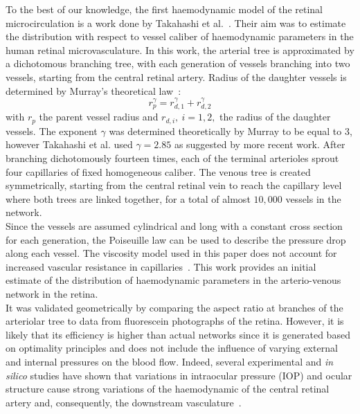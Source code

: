 \documentclass[12pt,a4paper]{article}
\begin{document}
To the best of our knowledge, the first haemodynamic model of the retinal microcirculation is a work done by Takahashi et al.~\cite{Takahashi_2009}.
Their aim was to estimate the distribution with respect to vessel caliber of haemodynamic parameters in the human retinal microvasculature.
In this work, the arterial tree is approximated by a dichotomous branching tree, with each generation of vessels branching into two vessels, starting from the central retinal artery.
Radius of the daughter vessels is determined by Murray's theoretical law~\cite{Murray_1926}:
\begin{equation}
  \label{eq:MurrayLaw}
  r_p^\gamma = r_{d,1}^\gamma + r_{d,2}^\gamma
\end{equation}
with $r_p$ the parent vessel radius and $r_{d,i},~i=1,2,$ the radius of the daughter vessels.
The exponent $\gamma$ was determined theoretically by Murray to be equal to $3$, however Takahashi et al. used $\gamma=2.85$ as suggested by more recent work.
After branching dichotomously fourteen times, each of the terminal arterioles sprout four capillaries of fixed homogeneous caliber. 
The venous tree is created symmetrically, starting from the central retinal vein to reach the capillary level where both trees are linked together, for a total of almost $10,000$ vessels in the network.\\
Since the vessels are assumed cylindrical and long with a constant cross section for each generation, the Poiseuille law can be used to describe the pressure drop along each vessel.
The viscosity model used in this paper does not account for increased vascular resistance in capillaries~\cite{Haynes_1960}. 
This work provides an initial estimate of the distribution of haemodynamic parameters in the arterio-venous network in the retina. \\
It was validated geometrically by comparing the aspect ratio at branches of the arteriolar tree to data from fluorescein photographs of the retina. 
However, it is likely that its efficiency is higher than actual networks since it is generated based on optimality principles and does not include the influence of varying external and internal pressures on the blood flow.
Indeed, several experimental and \textit{in silico} studies have shown that variations in intraocular pressure (IOP) and ocular structure cause strong variations of the haemodynamic of the central retinal artery and, consequently, the downstream vasculature~\cite{Guidoboni_2014, Harris_1996}.
\end{document}
